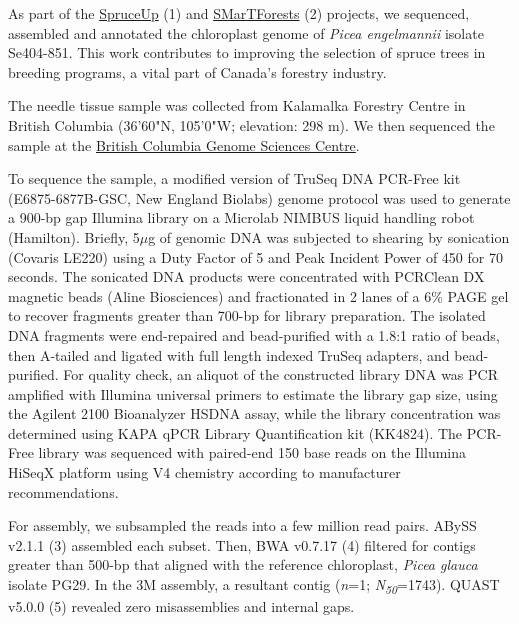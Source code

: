 \documentclass[titlepage,11pt, oneside]{article}   	%
\begin{document}
As part of the \href{http://spruce-up.ca/en/}{SpruceUp} (1) and \href{https://www.smartforests.ca}{SMarTForests} (2) projects, we sequenced, assembled and annotated the chloroplast genome of \textit{Picea engelmannii} isolate Se404-851. This work contributes to improving the selection of spruce trees in breeding programs, a vital part of Canada’s forestry industry.
\newline
\par
The needle tissue sample was collected from Kalamalka Forestry Centre in British Columbia (36'60"N, 105'0"W; elevation: 298 m). We then sequenced the sample at the \href{http://www.bcgsc.ca}{British Columbia Genome Sciences Centre}.
\newline
\par
To sequence the sample, a modified version of TruSeq DNA PCR-Free kit (E6875-6877B-GSC, New England Biolabs) genome protocol was used to generate a 900-bp gap Illumina library on a Microlab NIMBUS liquid handling robot (Hamilton). Briefly, 5$\mu$g of genomic DNA was subjected to shearing by sonication (Covaris LE220) using a Duty Factor of 5 and Peak Incident Power of 450 for 70 seconds. The sonicated DNA products were concentrated with PCRClean DX magnetic beads (Aline Biosciences) and fractionated in 2 lanes of a 6\% PAGE gel to recover fragments greater than 700-bp for library preparation.  The isolated DNA fragments were end-repaired and bead-purified with a 1.8:1 ratio of beads, then A-tailed and ligated with full length indexed TruSeq adapters, and bead-purified. For quality check, an aliquot of the constructed library DNA was PCR amplified with Illumina universal primers to estimate the library gap size, using the Agilent 2100 Bioanalyzer HSDNA assay, while the library concentration was determined using KAPA qPCR Library Quantification kit (KK4824). The PCR-Free library was sequenced with paired-end 150 base reads on the Illumina HiSeqX platform using V4 chemistry according to manufacturer recommendations.
\newline
\par
For assembly, we subsampled the reads into a few million read pairs. ABySS v2.1.1 (3) assembled each subset. Then, BWA v0.7.17 (4) filtered for contigs greater than 500-bp that aligned with the reference chloroplast, \textit{Picea glauca} isolate PG29. In the 3M assembly, a resultant contig (\textit{n}=1; \textit{N\textsubscript{50}}=1743). QUAST v5.0.0 (5) revealed zero misassemblies and internal gaps.
\newline
\par
\end{document}
